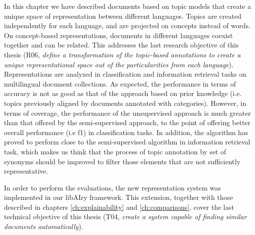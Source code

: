In this chapter we have described documents based on topic models that create a unique space of representation between different languages. Topics are created independently for each language, and are projected on concepts instead of words. On concept-based representations, documents in different languages coexist together and can be related. This addresses the last research objective of this thesis (R06, \textit{define a transformation of the topic-based annotations to create a unique representational space out of the particularities from each language}). Representations are analyzed in classification and information retrieval tasks on multilingual document collections. As expected, the performance in terms of accuracy is not as good as that of the approach based on prior knowledge (i.e. topics previously aligned by documents annotated with categories). However, in terms of coverage, the performance of the unsupervised approach is much greater than that offered by the semi-supervised approach, to the point of offering better overall performance (i.e f1) in classification tasks. 
In addition, the algorithm has proved to perform close to the semi-supervised algorithm in information retrieval task, which makes us think that the process of topic annotation by set of synonyms should be improved to filter those elements that are not sufficiently representative. 

In order to perform the evaluations, the new representation system was implemented in our libAIry framework. This extension, together with those described in chapters \ref{ch:explainability} and \ref{ch:comparisons}, cover the last technical objective of this thesis (T04, \textit{create a system capable of finding similar documents automatically}). 